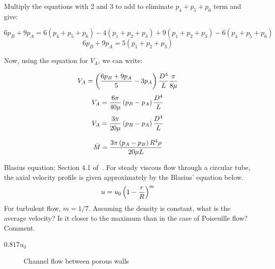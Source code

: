 \begin{solution}[print]
Multiply the equations with 2 and 3 to add to eliminate $ p_4 + p_5 + p_6$ term and give:

$$ 6 p_B + 9 p_A = 6 \left( p_4 + p_5 + p_6 \right) - 4 \left( p_1 + p_2 + p_3 \right) + 9 \left( p_1 + p_2 + p_3 \right) - 6 \left( p_4 + p_5 + p_6 \right)$$
$$ 6 p_B + 9 p_A = 5 \left( p_1 + p_2 + p_3 \right) $$

Now, using the equation for $V_A$, we can write:

$$ V_A = \left({ { 6p_B + 9 p_A} \over 5} - 3 p_A \right) {D^4 \over L} { \pi \over 8 \mu} $$
$$ V_A = {6 \pi \over 40 \mu} \left( p_B - p_A \right) {D^4 \over L} $$
$$ V_A = {3 \pi \over 20 \mu} \left( p_B - p_A \right) {D^4 \over L} $$

$$\dot{M} = {3 \pi \left( p_A - p_B \right) R^4 \rho \over 20 \mu L}$$
\end{solution}


\begin{question}
Blasius equation: Section 4.1 of~\cite{gaskell}. For steady viscous flow through a circular tube, the axial velocity profile is given approximately by the Blasius' equation below.
$$ u = u_0 \left( 1 - {r \over R} \right)^m$$
For turbulent flow, $m = {1 / 7}$. Assuming the density is constant, what is the average velocity? Is it closer to the maximum than in the case of Poiseuille flow? Comment.\\
\end{question}
\begin{solution}[print]
$0.817 u_0$
\end{solution}

\begin{figure}[h]
\begin{center}
\end{center}
\caption{Channel flow between porous walls}
\label{PorousChannel}
\end{figure}


